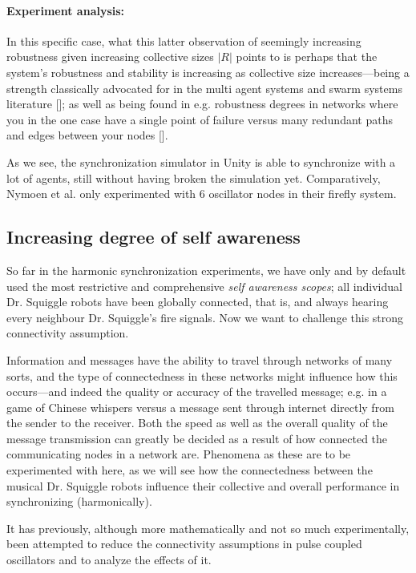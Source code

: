 		\paragraph{Experiment analysis:\nl}
		
		In this specific case, what this latter observation of seemingly increasing robustness given increasing collective sizes $|R|$ points to is perhaps that the system's robustness and stability is increasing as collective size increases—being a strength classically advocated for in the multi agent systems and swarm systems literature []; as well as being found in e.g. robustness degrees in networks where you in the one case have a single point of failure versus many redundant paths and edges between your nodes [].
		
		As we see, the synchronization simulator in Unity is able to synchronize with a lot of agents, still without having broken the simulation yet. Comparatively, Nymoen et al. \cite{nymoen_synch} only experimented with 6 oscillator nodes in their firefly system.
	

	\subsection{Increasing degree of self awareness}
	\label{exp:phasesync:increasing_SA_deg}
	
	So far in the harmonic synchronization experiments, we have only and by default used the most restrictive and comprehensive \textit{self awareness scopes}; all individual Dr. Squiggle robots have been globally connected, that is, and always hearing every neighbour Dr. Squiggle's fire signals. Now we want to challenge this strong connectivity assumption.
	
	Information and messages have the ability to travel through networks of many sorts, and the type of connectedness in these networks might influence how this occurs—and indeed the quality or accuracy of the travelled message; e.g. in a game of Chinese whispers versus a message sent through internet directly from the sender to the receiver. Both the speed as well as the overall quality of the message transmission can greatly be decided as a result of how connected the communicating nodes in a network are. Phenomena as these are to be experimented with here, as we will see how the connectedness between the musical Dr. Squiggle robots influence their collective and overall performance in synchronizing (harmonically).
	
	It has previously, although more mathematically and not so much experimentally, been attempted to reduce the connectivity assumptions in pulse coupled oscillators \cite{minimally_connected_pcos} and to analyze the effects of it.
	

